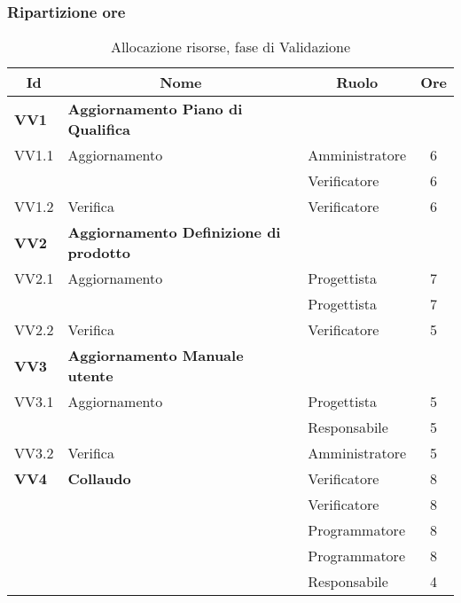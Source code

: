 \subsubsection{Ripartizione ore}

\begin{table}[H]
	\centering
	\begin{tabular}{ l l l c  }
	\hline
	\multicolumn{1}{c}{\textbf{Id}} & 
	\multicolumn{1}{c}{\textbf{Nome}} & 
	\multicolumn{1}{c}{\textbf{Ruolo}}& 
	\multicolumn{1}{c}{\textbf{Ore}} \\
	\hline
	\textbf{VV1} & \textbf{Aggiornamento Piano di Qualifica} \\
	\cline{3-4}
	VV1.1 & Aggiornamento  & Amministratore & 6\\ 
	 & & Verificatore & 6\\
    \cline{3-4}
	VV1.2 & Verifica & Verificatore &  6\\
	\hline
	\textbf{VV2} & \textbf{Aggiornamento Definizione di prodotto} \\
	\cline{3-4}
	VV2.1 & Aggiornamento  & Progettista & 7\\ 
	 & & Progettista & 7\\
    \cline{3-4}
	VV2.2 & Verifica & Verificatore &  5\\
	\hline
	\textbf{VV3} & \textbf{Aggiornamento Manuale utente} \\
	\cline{3-4}
	VV3.1 & Aggiornamento  & Progettista & 5\\ 
	 & & Responsabile & 5\\
    \cline{3-4}
	VV3.2 & Verifica & Amministratore &  5\\
	\hline
	\textbf{VV4} & \textbf{Collaudo} & Verificatore & 8\\
	 & & Verificatore & 8\\
	 & & Programmatore & 8\\
	 & & Programmatore & 8\\
	 & & Responsabile & 4\\
	\hline
	\end{tabular}
	\caption{Allocazione risorse, fase di Validazione}
	\end{table}	
	
	